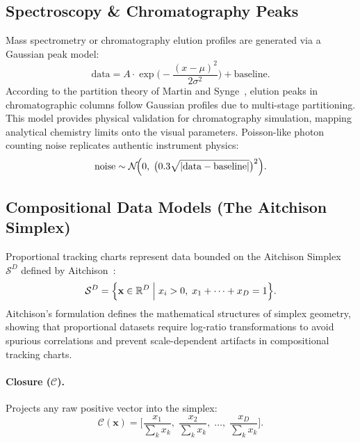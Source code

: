 \documentclass[11pt,twocolumn]{article}
\newcommand{\simplex}{\mathcal{S}}
\newcommand{\closure}{\mathcal{C}}
\newcommand{\R}{\mathbb{R}}
\newcommand{\N}{\mathcal{N}}
\begin{document}
\subsection{Spectroscopy \& Chromatography Peaks}\label{sec:peaks}

Mass spectrometry or chromatography elution profiles are generated via a Gaussian peak model:
\begin{equation}\label{eq:gauss_peak}
  \text{data} = A \cdot \exp\!\biggl(-\frac{(x-\mu)^2}{2\sigma^2}\biggr) + \text{baseline}.
\end{equation}
According to the partition theory of Martin and Synge~\cite{martin1941new}, elution peaks in chromatographic columns follow Gaussian profiles due to multi-stage partitioning. This model provides physical validation for chromatography simulation, mapping analytical chemistry limits onto the visual parameters. Poisson-like photon counting noise replicates authentic instrument physics:
\begin{equation}\label{eq:poisson_noise}
  \text{noise} \sim \N\!\Bigl(0,\;\bigl(0.3\sqrt{|\text{data}-\text{baseline}|}\bigr)^2\Bigr).
\end{equation}

\subsection{Compositional Data Models (The Aitchison Simplex)}\label{sec:simplex}

Proportional tracking charts represent data bounded on the Aitchison Simplex $\simplex^D$ defined by Aitchison~\cite{aitchison1986statistical}:
\begin{equation}\label{eq:simplex}
  \simplex^D = \Bigl\{\mathbf{x} \in \R^D \;\Big|\; x_i > 0,\; x_1 + \dots + x_D = 1\Bigr\}.
\end{equation}
Aitchison's formulation defines the mathematical structures of simplex geometry, showing that proportional datasets require log-ratio transformations to avoid spurious correlations and prevent scale-dependent artifacts in compositional tracking charts.

\paragraph{Closure ($\closure$).} Projects any raw positive vector into the simplex:
\begin{equation}\label{eq:closure}
  \closure(\mathbf{x}) = \biggl[\frac{x_1}{\sum_k x_k},\;\frac{x_2}{\sum_k x_k},\;\ldots,\;\frac{x_D}{\sum_k x_k}\biggr].
\end{equation}
\end{document}
